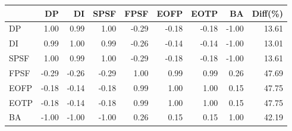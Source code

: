 \begin{tabular}{l|rrrrrrr|r}
\toprule
 & DP & DI & SPSF & FPSF & EOFP & EOTP & BA & Diff(\%)  \\
\midrule
DP & 1.00 & 0.99 & 1.00 & -0.29 & -0.18 & -0.18 & -1.00 & 13.61  \\
DI & 0.99 & 1.00 & 0.99 & -0.26 & -0.14 & -0.14 & -1.00 & 13.01  \\
SPSF & 1.00 & 0.99 & 1.00 & -0.29 & -0.18 & -0.18 & -1.00 & 13.61  \\
FPSF & -0.29 & -0.26 & -0.29 & 1.00 & 0.99 & 0.99 & 0.26 & 47.69  \\
EOFP & -0.18 & -0.14 & -0.18 & 0.99 & 1.00 & 1.00 & 0.15 & 47.75  \\
EOTP & -0.18 & -0.14 & -0.18 & 0.99 & 1.00 & 1.00 & 0.15 & 47.75  \\
BA & -1.00 & -1.00 & -1.00 & 0.26 & 0.15 & 0.15 & 1.00 & 42.19  \\
\bottomrule
\end{tabular}

